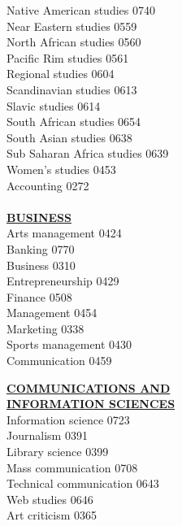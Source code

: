 \documentclass[9pt,twoside]{article}
\newcommand{\categoryheading}[1]{{\fontsize{8}{11}\selectfont \textbf{\uline{#1}}}}
\begin{document}
\begin{multicols}{3}
Native American studies \hfill 0740 \\
Near Eastern studies \hfill 0559 \\
North African studies \hfill 0560 \\
Pacific Rim studies \hfill 0561 \\
Regional studies \hfill 0604 \\
Scandinavian studies \hfill 0613 \\
Slavic studies \hfill 0614 \\
South African studies \hfill 0654 \\
South Asian studies \hfill 0638 \\
Sub Saharan Africa studies \hfill 0639 \\
Women's studies \hfill 0453 \\
Accounting \hfill 0272 \\
\columnbreak \\
\categoryheading{BUSINESS} \\
Arts management \hfill 0424 \\
Banking \hfill 0770 \\
Business \hfill 0310 \\
Entrepreneurship \hfill 0429 \\
Finance \hfill 0508 \\
Management \hfill 0454 \\
Marketing \hfill 0338 \\
Sports management \hfill 0430 \\
Communication \hfill 0459

\categoryheading{COMMUNICATIONS AND \\
INFORMATION SCIENCES} \\
Information science \hfill 0723 \\
Journalism \hfill 0391 \\
Library science \hfill 0399 \\
Mass communication \hfill 0708 \\
Technical communication \hfill 0643 \\
Web studies \hfill 0646 \\
Art criticism \hfill 0365


\end{multicols}
\end{document}
